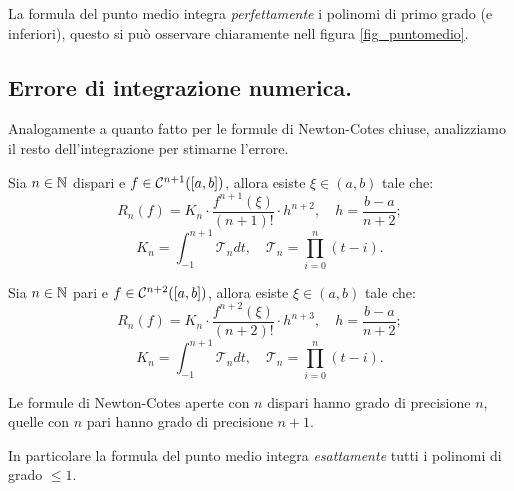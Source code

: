 La formula del punto medio integra \emph{perfettamente} i polinomi di primo
grado (e inferiori), questo si può osservare chiaramente nell figura 
\ref{fig_puntomedio}.


\subsection{Errore di integrazione numerica.}
Analogamente a quanto fatto per le formule di Newton-Cotes chiuse, analizziamo
il resto dell'integrazione per stimarne l'errore.

\begin{teo}
Sia $n \in \mathbb{N}$ dispari e $f \in \mathcal{C}^{n+1}([a,b])$, allora esiste $\xi \in
(a,b)$ tale che:
\[
R_n(f) = K_n \cdot \frac{f^{n+1}(\xi)}{(n+1)!} \cdot h^{n+2}, \quad 
h = \frac{b-a}{n+2};
\]
\[
K_n = \int_{-1}^{n+1}\mathcal{T}_ndt, \quad \mathcal{T}_n = \prod_{i=0}^n(t-i).
\]
\end{teo}
\begin{teo}
Sia $n \in \mathbb{N}$ pari e $f \in \mathcal{C}^{n+2}([a,b])$, allora esiste $\xi \in
(a,b)$ tale che:
\[
R_n(f) = K_n \cdot \frac{f^{n+2}(\xi)}{(n+2)!} \cdot h^{n+3}, \quad 
h = \frac{b-a}{n+2};
\]
\[
K_n = \int_{-1}^{n+1}\mathcal{T}_ndt, \quad \mathcal{T}_n = \prod_{i=0}^n(t-i).
\]
\end{teo}
\begin{cor}
Le formule di Newton-Cotes aperte con $n$ dispari hanno grado di precisione
$n$, quelle con $n$ pari hanno grado di precisione $n+1$.
\end{cor}

\begin{osse}
In particolare la formula del punto medio integra \emph{esattamente} tutti i
polinomi di grado $\leq 1$.
\end{osse}


